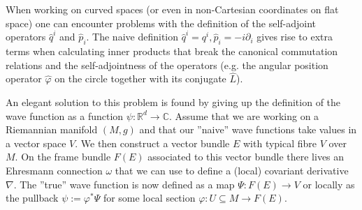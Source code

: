     \begin{construct}
        When working on curved spaces (or even in non-Cartesian coordinates on flat space) one can encounter problems with the definition of the self-adjoint operators $\hat{q}^i$ and $\hat{p}_i$. The naive definition $\hat{q}^i = q^i, \hat{p}_i = -i\partial_i$ gives rise to extra terms when calculating inner products that break the canonical commutation relations and the self-adjointness of the operators (e.g. the angular position operator $\hat{\varphi}$ on the circle together with its conjugate $\hat{L}$).

        An elegant solution to this problem is found by giving up the definition of the wave function as a function $\psi:\mathbb{R}^d\rightarrow\mathbb{C}$. Assume that we are working on a Riemannian manifold $(M, g)$ and that our ''naive'' wave functions take values in a vector space $V$. We then construct a vector bundle $E$ with typical fibre $V$ over $M$. On the frame bundle $F(E)$ associated to this vector bundle there lives an Ehresmann connection $\omega$ that we can use to define a (local) covariant derivative $\nabla$. The ''true'' wave function is now defined as a map $\Psi: F(E)\rightarrow V$ or locally as the pullback $\psi := \varphi^*\Psi$ for some local section $\varphi:U\subseteq M\rightarrow F(E)$.


\end{construct}
